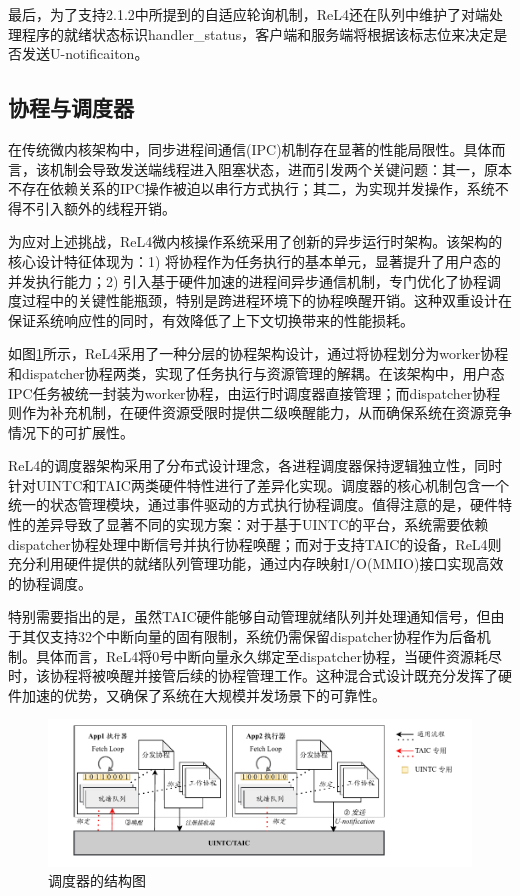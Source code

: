 最后，为了支持2.1.2中所提到的自适应轮询机制，ReL4还在队列中维护了对端处理程序的就绪状态标识handler\_status，客户端和服务端将根据该标志位来决定是否发送U-notificaiton。

\subsection{协程与调度器}
在传统微内核架构中，同步进程间通信(IPC)机制存在显著的性能局限性。具体而言，该机制会导致发送端线程进入阻塞状态，进而引发两个关键问题：其一，原本不存在依赖关系的IPC操作被迫以串行方式执行；其二，为实现并发操作，系统不得不引入额外的线程开销。

为应对上述挑战，ReL4微内核操作系统采用了创新的异步运行时架构。该架构的核心设计特征体现为：1) 将协程作为任务执行的基本单元，显著提升了用户态的并发执行能力；2) 引入基于硬件加速的进程间异步通信机制，专门优化了协程调度过程中的关键性能瓶颈，特别是跨进程环境下的协程唤醒开销。这种双重设计在保证系统响应性的同时，有效降低了上下文切换带来的性能损耗。

如图\ref{fig:executor}所示，ReL4采用了一种分层的协程架构设计，通过将协程划分为worker协程和dispatcher协程两类，实现了任务执行与资源管理的解耦。在该架构中，用户态IPC任务被统一封装为worker协程，由运行时调度器直接管理；而dispatcher协程则作为补充机制，在硬件资源受限时提供二级唤醒能力，从而确保系统在资源竞争情况下的可扩展性。

ReL4的调度器架构采用了分布式设计理念，各进程调度器保持逻辑独立性，同时针对UINTC和TAIC两类硬件特性进行了差异化实现。调度器的核心机制包含一个统一的状态管理模块，通过事件驱动的方式执行协程调度。值得注意的是，硬件特性的差异导致了显著不同的实现方案：对于基于UINTC的平台，系统需要依赖dispatcher协程处理中断信号并执行协程唤醒；而对于支持TAIC的设备，ReL4则充分利用硬件提供的就绪队列管理功能，通过内存映射I/O(MMIO)接口实现高效的协程调度。

特别需要指出的是，虽然TAIC硬件能够自动管理就绪队列并处理通知信号，但由于其仅支持32个中断向量的固有限制，系统仍需保留dispatcher协程作为后备机制。具体而言，ReL4将0号中断向量永久绑定至dispatcher协程，当硬件资源耗尽时，该协程将被唤醒并接管后续的协程管理工作。这种混合式设计既充分发挥了硬件加速的优势，又确保了系统在大规模并发场景下的可靠性。


\begin{figure}[htbp]
  \centering
  \includegraphics[width=1.0\textwidth]{figures/TAIC.pdf}
  \caption{调度器的结构图}\label{fig:executor}
\end{figure}

